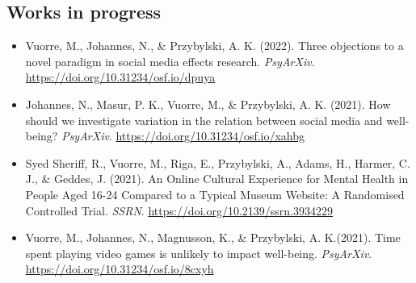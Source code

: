 \documentclass[12pt, a4paper]{article}
\begin{document}
\subsection*{Works in progress}
\begin{itemize}
\item Vuorre, M., Johannes, N., \& Przybylski, A. K. (2022). Three objections to a novel paradigm in social media effects research. \emph{PsyArXiv}. \url{https://doi.org/10.31234/osf.io/dpuya}
\item Johannes, N., Masur, P. K., Vuorre, M., \& Przybylski, A. K. (2021). How should we investigate variation in the relation between social media and well-being? \emph{PsyArXiv}. \url{https://doi.org/10.31234/osf.io/xahbg}
\item Syed Sheriff, R., Vuorre, M., Riga, E., Przybylski, A., Adams, H., Harmer, C. J., \& Geddes, J. (2021). An Online Cultural Experience for Mental Health in People Aged 16-24 Compared to a Typical Museum Website: A Randomised Controlled Trial. \emph{SSRN}. \url{https://doi.org/10.2139/ssrn.3934229}
\item Vuorre, M.\footnotemark[1], Johannes, N.\footnotemark[1], Magnusson, K., \& Przybylski, A. K.\footnotemark[1] (2021). Time spent playing video games is unlikely to impact well-being. \emph{PsyArXiv}. \url{https://doi.org/10.31234/osf.io/8cxyh}

\end{itemize}
\end{document}
